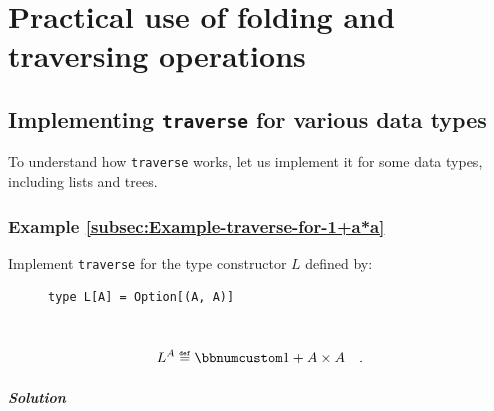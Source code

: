 \section{Practical use of folding and traversing operations}

\subsection{Implementing \texttt{traverse} for various data types}

To understand how \lstinline!traverse! works, let us implement it
for some data types, including lists and trees.

\subsubsection{Example \label{subsec:Example-traverse-for-1+a*a}\ref{subsec:Example-traverse-for-1+a*a}}

Implement \lstinline!traverse! for the type constructor $L$ defined
by:

\begin{figure}%
\vspace{-0.5\baselineskip}
\begin{lstlisting}
type L[A] = Option[(A, A)]
\end{lstlisting}
\vspace{-0.5\baselineskip}
\end{figure}%

~\vspace{-0.5\baselineskip}
\[
L^{A}\triangleq\bbnum 1+A\times A\quad.
\]


\subparagraph{Solution}

